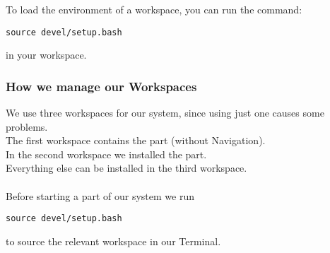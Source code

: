 \documentclass[main.tex]{subfiles}
\begin{document}
	To load the environment of a workspace, you can run the command:
	\begin{lstlisting}
source devel/setup.bash
\end{lstlisting}
	in your workspace.
	
	\subsubsection{How we manage our Workspaces}
	
	We use three workspaces for our system, since using just one causes some problems.\\
	The first workspace contains the  part (without Navigation).\\
	In the second workspace we installed the  part.\\
	Everything else can be installed in the third workspace.\\
	\\
	Before starting a part of our system we run 
	\begin{lstlisting}
source devel/setup.bash
\end{lstlisting}
to source the relevant workspace in our Terminal.
	
\end{document}
